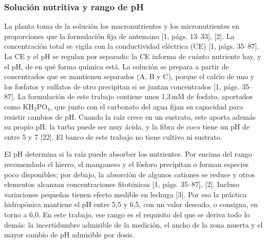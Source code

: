 \subsubsection{Solución nutritiva y rango de pH}\label{sec:solucion}
La planta toma de la solución los macronutrientes y los micronutrientes en proporciones que la formulación fija de antemano [1, págs. 13–33], [2]. La concentración total se vigila con la conductividad eléctrica (CE) [1, págs. 35–87]. La CE y el pH se regulan por separado: la CE informa de cuánto nutriente hay, y el pH, de en qué forma química está. La solución se prepara a partir de concentrados que se mantienen separados (A, B y C), porque el calcio de uno y los fosfatos y sulfatos de otro precipitan si se juntan concentrados [1, págs. 35–87]. La formulación de este trabajo contiene unos 1,3\,mM de fosfato, aportados como KH$_2$PO$_4$, que junto con el carbonato del agua fijan su capacidad para resistir cambios de pH. Cuando la raíz crece en un sustrato, este aporta además su propio pH: la turba puede ser muy ácida, y la fibra de coco tiene un pH de entre 5 y 7 [22]. El banco de este trabajo no tiene cultivo ni sustrato.

El pH determina si la raíz puede absorber los nutrientes. Por encima del rango recomendado el hierro, el manganeso y el fósforo precipitan o forman especies poco disponibles; por debajo, la absorción de algunos cationes se reduce y otros elementos alcanzan concentraciones fitotóxicas [1, págs. 35–87], [2]. Incluso variaciones pequeñas tienen efecto medible en lechuga [3]. Por eso la práctica hidropónica mantiene el pH entre 5,5 y 6,5, con un valor deseado, o consigna, en torno a 6,0. En este trabajo, ese rango es el requisito del que se deriva todo lo demás: la incertidumbre admisible de la medición, el ancho de la zona muerta y el mayor cambio de pH admisible por dosis.

